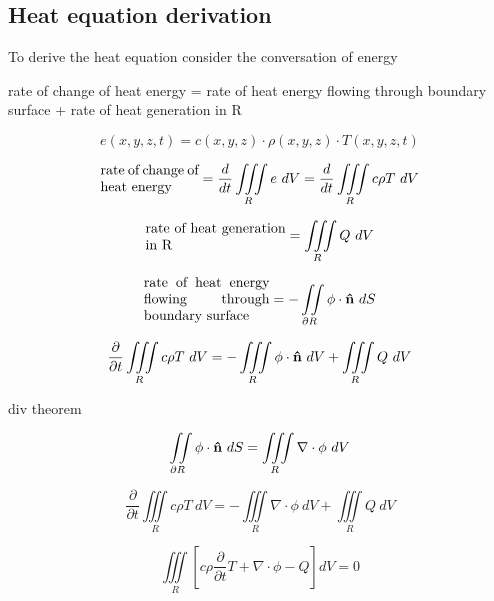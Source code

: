 \begin{appendices}
\chapter{Heat equation derivation}

To derive the heat equation consider the conversation of energy

rate of change of heat energy = rate of heat energy flowing through boundary surface + rate of heat generation in R


\begin{equation}
e(x,y,z,t)=c(x,y,z)\cdot \rho(x,y,z)\cdot T(x,y,z,t)
\end{equation} 

\begin{equation}
\parbox{70pt}{rate of change of heat energy} =\frac{d}{dt} \iiint\limits_{R} e\ dV= \frac{d}{dt}\iiint\limits_{R} c\rho T\ dV
\end{equation}


\begin{equation}
\parbox{100pt}{rate of heat generation in R} = \iiint\limits_{R} Q\ dV
\end{equation}

\begin{equation}
\parbox{90pt}{rate of heat energy flowing through boundary surface} = -\iint \limits_{\partial R} \phi\cdot \bold{\hat{n}}\ dS
\end{equation}

\begin{equation}
\frac{\partial}{\partial t} \iiint\limits_{R} c\rho T\ dV = -\iiint \limits_{R} \phi\cdot \bold{\hat{n}}\ dV +  \iiint\limits_{R} Q\ dV
\end{equation}

div theorem 

\begin{equation}
\iint \limits_{\partial R} \phi\cdot \bold{\hat{n}}\ dS = \iiint \limits_{R} \nabla\cdot \phi\ dV
\end{equation}

\begin{equation}
\frac{\partial}{\partial t} \iiint\limits_{R} c\rho T\ dV = -\iiint \limits_{R} \nabla\cdot \phi\ dV +  \iiint\limits_{R} Q\ dV
\end{equation}

\begin{equation}
\iiint\limits_{R} \left[ c\rho \frac{\partial}{\partial t} T + \nabla\cdot \phi - Q\right] dV = 0
\end{equation}


\end{appendices}
